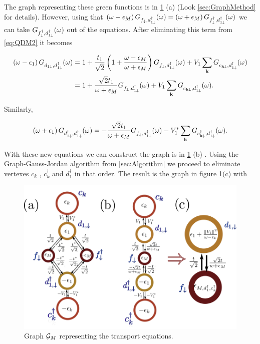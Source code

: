 The graph representing these green functions is in \ref{fig:green-M-QD} (a)  (Look \ref{sec:GraphMethod} for details). However, using that $\left(\omega-\epsilon_{M}\right)G_{f_{\downarrow},d_{1\downarrow}^{\dagger}}(\omega)=\left(\omega+\epsilon_{M}\right)G_{f_{\downarrow}^{\dagger},d_{1\downarrow}^{\dagger}}(\omega)$ we can take
 $G_{f_{\downarrow}^{\dagger},d_{1\downarrow}^{\dagger}}(\omega)$ out of the equations. After eliminating this term from \eqref{eq:QDM2} it becomes
 
 \begin{align}
\left(\omega-\epsilon_{1}\right)G_{d_{1\downarrow},d_{1\downarrow}^{\dagger}}(\omega)&=1+\frac{t_{1}}{\sqrt{2}}\left(1+\frac{\omega-\epsilon_{M}}{\omega+\epsilon_{M}}\right)G_{f_{\downarrow},d_{1\downarrow}^{\dagger}}(\omega)+V_{1}\sum_{\mathbf{k}}G_{c_{\mathbf{k\downarrow}},d_{1\downarrow}^{\dagger}}(\omega) \\
&=1+\frac{\sqrt{2}t_{1}}{\omega+\epsilon_{M}}G_{f_{\downarrow},d_{1\downarrow}^{\dagger}}(\omega)+V_{1}\sum_{\mathbf{k}}G_{c_{\mathbf{k\downarrow}},d_{1\downarrow}^{\dagger}}(\omega).
\end{align}

\noindent Similarly, 

\begin{equation}
    \left(\omega+\epsilon_{1}\right)G_{d_{1\downarrow}^{\dagger},d_{1\downarrow}^{\dagger}}(\omega)=-\frac{\sqrt{2}t_{1}}{\omega+\epsilon_{M}}G_{f_{\downarrow},d_{1\downarrow}^{\dagger}}(\omega)-V_{1}^{*}\sum_{\mathbf{k}}G_{c_{\mathbf{k\downarrow}}^{\dagger},d_{1\downarrow}^{\dagger}}(\omega).
\end{equation} 
 
 
 With these new equations we can construct the graph is  in \ref{fig:green-M-QD} (b) .  Using the Graph-Gauss-Jordan algorithm from \ref{sec:Algorithm}  we proceed to eliminate vertexes $c_k$ , $c_k^\dagger$ and $d_1^\dagger$ in that order. The result is the graph in figure \ref{fig:green-M-QD}(c) with 
 
 \begin{figure}[t]
    \centering
    \includegraphics[scale=0.5]{IMAGES/Graphs/Grenn-Majorana.png}
    \caption{ \label{fig:green-M-QD} Graph $\mathcal{G}_M$ representing the transport equations.   \protect\Source{}}
\end{figure}
 
